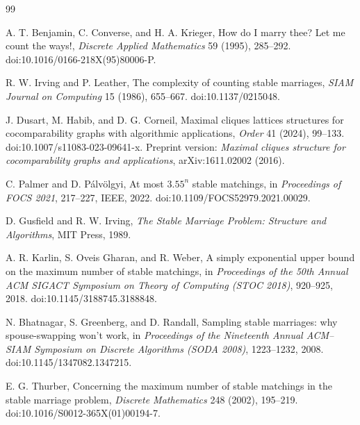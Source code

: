 \documentclass[11pt]{article}
\numberwithin{equation}{section}
\theoremstyle{definition}
\theoremstyle{remark}
\begin{document}
\begin{thebibliography}{99}

A. T. Benjamin, C. Converse, and H. A. Krieger,
How do I marry thee? Let me count the ways!,
\emph{Discrete Applied Mathematics} 59 (1995), 285--292.
doi:10.1016/0166-218X(95)80006-P.

R. W. Irving and P. Leather,
The complexity of counting stable marriages,
\emph{SIAM Journal on Computing} 15 (1986), 655--667.
doi:10.1137/0215048.

J. Dusart, M. Habib, and D. G. Corneil,
Maximal cliques lattices structures for cocomparability graphs with
algorithmic applications,
\emph{Order} 41 (2024), 99--133.
doi:10.1007/s11083-023-09641-x.
Preprint version: \emph{Maximal cliques structure for cocomparability
graphs and applications}, arXiv:1611.02002 (2016).

C. Palmer and D. P\'alv\"olgyi,
At most $3.55^n$ stable matchings,
in \emph{Proceedings of FOCS 2021}, 217--227, IEEE, 2022.
doi:10.1109/FOCS52979.2021.00029.

D. Gusfield and R. W. Irving,
\emph{The Stable Marriage Problem: Structure and Algorithms},
MIT Press, 1989.

A. R. Karlin, S. Oveis Gharan, and R. Weber,
A simply exponential upper bound on the maximum number of stable matchings,
in \emph{Proceedings of the 50th Annual ACM SIGACT Symposium on Theory of
Computing (STOC 2018)}, 920--925, 2018.
doi:10.1145/3188745.3188848.

N. Bhatnagar, S. Greenberg, and D. Randall,
Sampling stable marriages: why spouse-swapping won't work,
in \emph{Proceedings of the Nineteenth Annual ACM--SIAM Symposium on
Discrete Algorithms (SODA 2008)}, 1223--1232, 2008.
doi:10.1145/1347082.1347215.

E. G. Thurber,
Concerning the maximum number of stable matchings in the stable marriage
problem,
\emph{Discrete Mathematics} 248 (2002), 195--219.
doi:10.1016/S0012-365X(01)00194-7.

\end{thebibliography}
\end{document}
